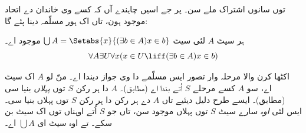 \documentclass[../../../include/open-logic-section]{subfiles}
\begin{document}

 توں سانوں اشتراک ملے سن۔
پر جے اسیں چاہندے آں کہ کسے وی خاندان دے اتحاد موجود ہون، تاں اک ہور
مسلّمہ دینا پئے گا:

\begin{axiom}[اتحاد] ہر سیٹ $A$ لئی سیٹ $\bigcup A =
\Setabs{x}{(\exists b \in A) x \in b}$ موجود اے۔
\[
	\forall A \exists U \forall x(x \in U \liff (\exists b \in A)x \in b)
\]
\end{axiom}

اکٹھا کرن والا مرحلہ وار تصور ایس مسلّمے دا وی جواز دیندا اے۔ منّ لو
$A$ اک سیٹ اے، سو $A$ کسے مرحلے $S$ اُتے بندا اے (\stageshier مطابق)۔
$A$ دا ہر رکن $S$ توں \emph{پہلاں} بنیا سی (\stagesacc مطابق)۔ ایسے
طرح دلیل دیئیے تاں $A$ دے ہر رکن دا ہر رکن $S$ توں پہلاں بنیا سی۔
ایس لئی \emph{اوہ} سارے سیٹ $S$ توں پہلاں موجود سن، تاں جو $S$
اُتے اوہناں توں اک سیٹ بن سکے۔ تے اوہ سیٹ ای $\bigcup A$ اے۔
\end{document}

